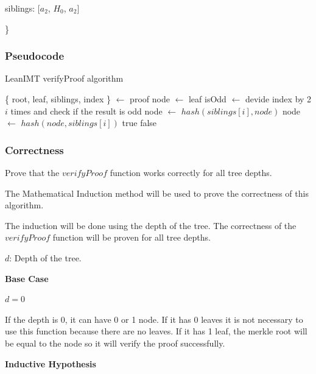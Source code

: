 \documentclass{article}
\begin{document}
siblings: [$a_2$, $H_0$, $a_2$]

\}


\subsubsection{Pseudocode}


\begin{algorithm}[H]
    \caption{LeanIMT verifyProof algorithm}\label{verifyProof}
    \begin{algorithmic}[1]
        \State \{ root, leaf, siblings, index \} $\gets$ proof 
        \State node $\gets$ leaf
        \State isOdd $\gets$ devide index by 2 $i$ times and check if the result is odd
         
        \State node $\gets$ $hash(siblings[i], node)$
        \Else {}
        \State node $\gets$ $hash(node, siblings[i])$
        \EndIf
        \EndFor
        \State \Return true
        \Else
        \State \Return false
        \EndIf
        \EndProcedure
    \end{algorithmic}
\end{algorithm}



\subsubsection{Correctness}

Prove that the $verifyProof$ function works correctly for all tree depths.

The Mathematical Induction method will be used to prove the correctness of this algorithm.

The induction will be done using the depth of the tree. The correctness of the $verifyProof$ function will be proven for all tree depths.

$d$: Depth of the tree.

\textbf{Base Case}

$d = 0$

If the depth is 0, it can have 0 or 1 node.
If it has 0 leaves it is not necessary to use this function because there are no leaves.
If it has 1 leaf, the merkle root will be equal to the node so it will verify the proof successfully.

\textbf{Inductive Hypothesis}
\end{document}
